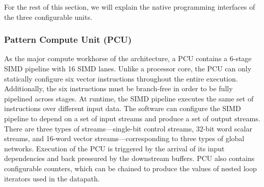 For the rest of this section, we will explain the native programming interfaces of the three
configurable units.

\subsubsection{Pattern Compute Unit (PCU)}
As the major compute workhorse of the architecture, a PCU contains a 6-stage SIMD pipeline with 16 SIMD lanes. 
Unlike a processor core, the PCU can only statically configure six vector instructions throughout the
entire execution.
Additionally, the six instructions must be branch-free in order to be fully pipelined across stages.
At runtime, the SIMD pipeline executes the same set of instructions over different input data.
The software can configure the SIMD pipeline to depend on a set of input streams and
produce a set of output streams. 
There are three types of streams---single-bit control streams, 32-bit word scalar streams, and
16-word vector streams---corresponding to three types of global networks.
Execution of the PCU is triggered by the arrival of its input dependencies and back pressured by
the downstream buffers.
PCU also contains configurable counters, which can be chained to produce the values of nested
loop iterators used in the datapath. 

